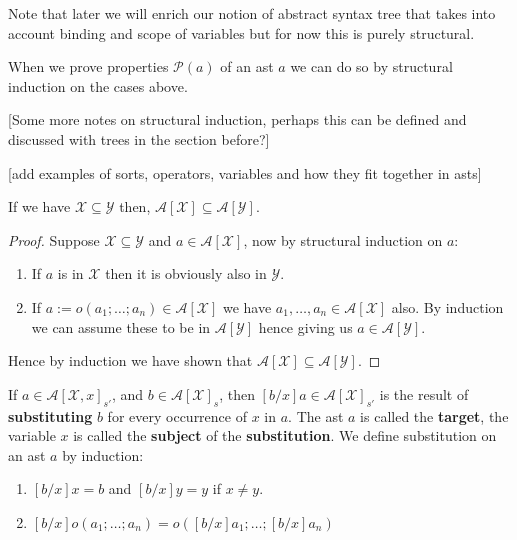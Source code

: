 \begin{remark}
    Note that later we will enrich our notion of abstract syntax tree that takes into account binding and scope of variables but for now this is purely structural.
\end{remark}


\begin{remark}
    When we prove properties $\mathcal{P}(a)$ of an ast $a$ we can do so by structural induction on the cases above.
\end{remark}

[Some more notes on structural induction, perhaps this can be defined and discussed with trees in the section before?]

[add examples of sorts, operators, variables and how they fit together in asts]

\begin{lemma}
    If we have $\mathcal{X} \subseteq \mathcal{Y}$ then, $\mathcal{A}[\mathcal{X}] \subseteq \mathcal{A}[\mathcal{Y}]$.
\end{lemma}
\begin{proof}
    Suppose $\mathcal{X} \subseteq \mathcal{Y}$ and $a \in \mathcal{A}[\mathcal{X}]$, now by structural induction on $a$:
    
    \begin{enumerate}
        \item If $a$ is in $\mathcal{X}$ then it is obviously also in $\mathcal{Y}$.
        \item If $a := o(a_1;\dots;a_n) \in \mathcal{A}[\mathcal{X}]$ we have $a_1, \dots, a_n\in \mathcal{A}[\mathcal{X}]$ also. By induction we can assume these to be in $\mathcal{A}[\mathcal{Y}]$ hence giving us $a \in \mathcal{A}[\mathcal{Y}]$.
    \end{enumerate}
    
    Hence by induction we have shown that $\mathcal{A}[\mathcal{X}] \subseteq \mathcal{A}[\mathcal{Y}]$.
\end{proof}

\begin{defin}[Substitution]
    If $a \in \mathcal{A}[\mathcal{X},x]_{s'}$, and $b \in \mathcal{A}[\mathcal{X}]_s$, then $[b/x]a \in \mathcal{A}[\mathcal{X}]_{s'}$ is the result of \textbf{substituting} $b$ for every occurrence of $x$ in $a$. The ast $a$ is called the \textbf{target}, the variable $x$ is called the \textbf{subject} of the \textbf{substitution}. We define substitution on an ast $a$ by induction:
    \begin{enumerate}
        \item $[b/x]x = b$ and $[b/x]y = y$ if $x\ne y$.
        \item $[b/x]o(a_1;\dots;a_n)=o([b/x]a_1;\dots;[b/x]a_n)$
    \end{enumerate}
\end{defin}

